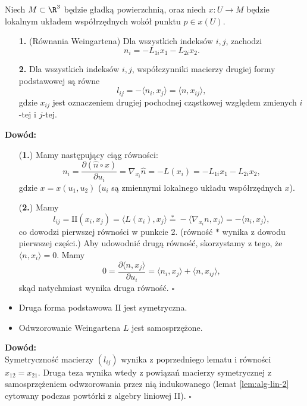 \begin{frame}[<+->]

\begin{lemat}
Niech $M\subset \R^3$ będzie gładką powierzchnią, oraz niech $x\colon U\to M$ będzie lokalnym układem współrzędnych wokół punktu $p\in x(U)$.
\begin{enumerate}
\item [\textbf{1.}](Równania Weingartena) Dla wszystkich indeksów $i,j$, zachodzi 
\[n_i=-L_{1i}x_1-L_{2i}x_2.\]
\item [\textbf{2.}]Dla wszystkich indeksów $i,j$, współczynniki macierzy drugiej formy podstawowej są równe
\[l_{ij}=-\langle n_i,x_j\rangle=\langle n,x_{ij}\rangle,\]
gdzie $x_{ij}$ jest oznaczeniem drugiej pochodnej cząstkowej względem zmienych $i$-tej i $j$-tej.
\end{enumerate}
\end{lemat}
\end{frame}
\begin{frame}

\textcolor{ared}{\textbf{Dowód:}}\\\pause 
\begin{enumerate}
\item [(\textbf{1.})]Mamy następujący ciąg równości:
\[n_i=\frac{\partial(\widehat{n}\circ x)}{\partial u_i}=\nabla_{x_i}\widehat{n}=-L(x_i)=-L_{1i}x_1-L_{2i}x_2,\]
gdzie $x=x(u_1,u_2)$ ($u_i$ są zmiennymi lokalnego układu współrzędnych $x$).
\pause \item [(\textbf{2.})]
Mamy \[l_{ij}=\text{II}(x_i,x_j)=\langle L(x_i),x_j\rangle\stackrel{*}{=}-\langle\nabla_{x_i}n,x_j\rangle=-\langle n_i,x_j\rangle,\]
co dowodzi pierwszej równości w punkcie 2. (równość $*$ wynika z dowodu pierwszej części.) \pause Aby udowodnić drugą równość, skorzystamy z tego, że $\langle n, x_i\rangle=0$. Mamy 
\pause \[0=\frac{\partial \langle n,x_j\rangle}{\partial u_i}=\langle n_i,x_j\rangle+\langle n,x_{ij}\rangle,\]skąd natychmiast wynika druga równość. \hfill $\square$
\end{enumerate}

\end{frame}
\begin{frame}

\begin{lemat}
\begin{itemize}
\pause \item Druga forma podstawowa $\text{II}$ jest symetryczna.
\pause \item Odwzorowanie Weingartena $L$ jest samosprzężone.
\end{itemize}
\end{lemat}
\textcolor{ared}{\textbf{Dowód:}}\\\pause 
Symetryczność macierzy $(l_{ij})$ wynika z poprzedniego lematu i równości $x_{12}=x_{21}$. \pause Druga teza wynika wtedy z powiązań macierzy symetrycznej z samosprzężeniem odwzorowania przez nią indukowanego (lemat \ref{lem:alg-lin-2} cytowany podczas powtórki z algebry liniowej II).
\hfill $\square$

\end{frame}

